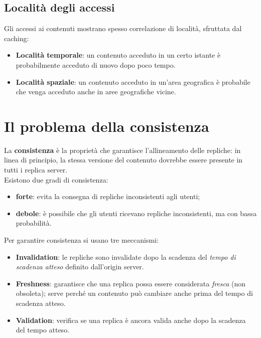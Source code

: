 \subsection{Località degli accessi}
Gli accessi ai contenuti mostrano spesso correlazione di località, sfruttata dal caching:
\begin{itemize}
	\item \textbf{Località temporale}: un contenuto acceduto in un certo istante è probabilmente acceduto di nuovo dopo poco tempo.
	\item \textbf{Località spaziale}: un contenuto acceduto in un'area geografica è probabile che venga acceduto anche in aree geografiche vicine.
\end{itemize}

\section{Il problema della consistenza}
La \textbf{consistenza} è la proprietà che garantisce l'allineamento delle repliche: in linea di principio, la stessa versione del contenuto dovrebbe essere presente in tutti i replica server.
\\
Esistono due gradi di consistenza:
\begin{itemize}
	\item \textbf{forte}: evita la consegna di repliche inconsistenti agli utenti;
	\item \textbf{debole}: è possibile che gli utenti ricevano repliche inconsistenti, ma con bassa probabilità.
\end{itemize}
Per garantire consistenza si usano tre meccanismi:
\begin{itemize}
	\item \textbf{Invalidation}: le repliche sono invalidate dopo la scadenza del \emph{tempo di scadenza atteso} definito dall'origin server.
	\item \textbf{Freshness}: garantisce che una replica possa essere considerata \emph{fresca} (non obsoleta); serve perché un contenuto può cambiare anche prima del tempo di scadenza atteso.
	\item \textbf{Validation}: verifica se una replica è ancora valida anche dopo la scadenza del tempo atteso.
\end{itemize}

